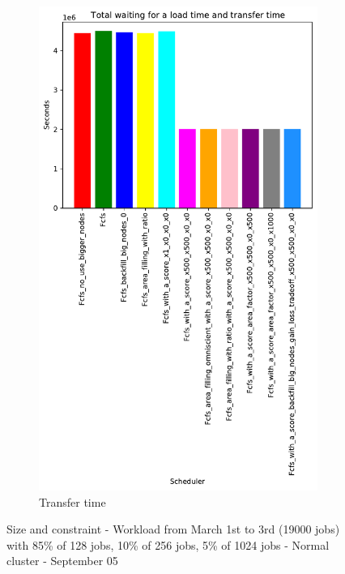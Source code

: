 \documentclass[a4paper]{article}
\begin{document}
\begin{figure}[H]
\begin{subfigure}[b]{0.4\linewidth}\centering\includegraphics[width=0.7\linewidth]{MBSS/plot/Results_Size_And_Data_2022-03-01->2022-03-03_V85105_Total_waiting_for_a_load_time_and_transfer_time_450_128_32_256_4_1024.pdf}\caption{Transfer time}\label{45}\end{subfigure}
\caption{Size and constraint - Workload from March 1st to 3rd (19000 jobs) with 85\% of 128 jobs, 10\% of 256 jobs, 5\% of 1024 jobs - Normal cluster - September 05}\label{49}\end{figure}
\end{document}
